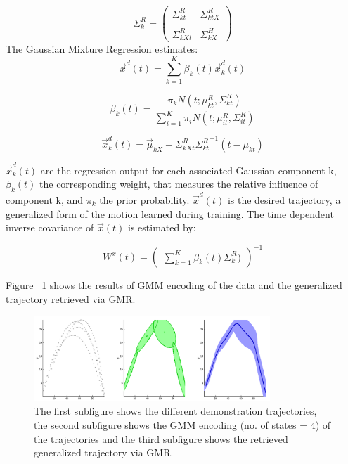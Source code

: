 \documentclass[conference]{IEEEtran}
\begin{document}
\begin{itemize}
{    \begin{equation}
        {\Sigma}_{k}^{R} = \begin{pmatrix} {\Sigma}_{kt}^{R}&{\Sigma}_{ktX}^{R}\\ \\ {\Sigma}_{kXt}^{R}&{\Sigma}_{kX}^{H} \end{pmatrix}
    \end{equation}
    The Gaussian Mixture Regression estimates:
    \begin{equation}
        \vec{x}^{d}(t) = \sum_{k=1}^{K} \beta_{k}(t)\vec{x}_{k}^{d}(t)
    \end{equation}

    \begin{equation}
        \beta_{k}(t) = \frac{\pi_{k}N(t;\mu_{kt}^{R},\Sigma_{kt}^{R})}{\sum_{i=1}^{K}\pi_{i}N(t;\mu_{it}^{R},\Sigma_{it}^{R})}
    \end{equation}

    \begin{equation}
        \vec{x}_{k}^{d}(t) = \vec{\mu}_{kX} + {\Sigma}_{kXt}^{R} {{\Sigma}_{kt}^{R}}^{-1} (t - \mu_{kt})
    \end{equation}

    $\vec{x}_{k}^{d}(t)$ are the regression output for each associated Gaussian component k, $\beta_{k}(t)$ the corresponding weight, that measures the relative influence of component k, and $\pi_{k}$ the prior probability. $\vec{x}^{d}(t)$ is the desired trajectory, a generalized form of the motion learned during training. The time dependent inverse covariance of $\vec{x}(t)$ is estimated by:

    \begin{equation}
        W^{x}(t)= \begin{pmatrix}{\sum_{k=1}^{K} \beta_{k}(t) {\Sigma}_{k}^{R})}\end{pmatrix}^{-1}
    \end{equation}
}
\end{itemize}

Figure ~\ref{fig:fig3} shows the results of GMM encoding of the data and the generalized trajectory retrieved via GMR.

\begin{figure}[!t]
\centering
\includegraphics[width=3.5in]{fig3}
\caption{The first subfigure shows the different demonstration trajectories, the second subfigure shows the GMM encoding (no. of states =  4) of the trajectories and the third subfigure shows the retrieved generalized trajectory via GMR.}
\label{fig:fig3}
\end{figure}
\end{document}
